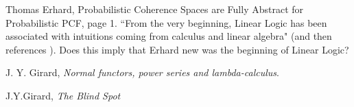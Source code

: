 \documentclass[12pt]{article}
\theoremstyle{plain}
\theoremstyle{definition}
\begin{document}
Thomas Erhard, Probabilistic Coherence Spaces are
Fully Abstract for Probabilistic PCF, page 1. ``From the very beginning, Linear Logic has been associated with intuitions coming from calculus and linear algebra" (and then references \cite{Girard}). Does this imply that Erhard new \cite{Girard} was the beginning of Linear Logic?
	
	\begin{thebibliography}{9}
		 J. Y. Girard, \emph{Normal functors, power series and lambda-calculus}.
		
		 J.Y.Girard, \emph{The Blind Spot}
		\end{thebibliography}
	
\end{document}
